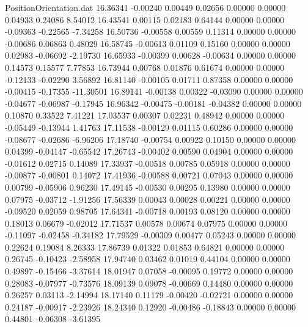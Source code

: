 \begin{filecontents}{PositionOrientation.dat}
  16.36341   -0.00240    0.00449     0.02656    0.00000    0.00000    0.04933    0.24086    8.54012
  16.43541    0.00115    0.02183     0.64144    0.00000    0.00000   -0.09363   -0.22565   -7.34258
  16.50736   -0.00558    0.00559     0.11314    0.00000    0.00000   -0.00686    0.06863    0.48029
  16.58745   -0.00613    0.01109     0.15160    0.00000    0.00000    0.02983   -0.06692   -2.19730
  16.65933   -0.00399    0.00628    -0.00634    0.00000    0.00000    0.14573    0.15577    7.77853
  16.73944    0.00768    0.01876     0.61674    0.00000    0.00000   -0.12133   -0.02290    3.56892
  16.81140   -0.00105    0.01711     0.87358    0.00000    0.00000   -0.00415   -0.17355  -11.30501
  16.89141   -0.00138    0.00322    -0.03090    0.00000    0.00000   -0.04677   -0.06987   -0.17945
  16.96342   -0.00475   -0.00181    -0.04382    0.00000    0.00000    0.10870    0.33522    7.41221
  17.03537    0.00307    0.02231     0.48942    0.00000    0.00000   -0.05449   -0.13944    1.41763
  17.11538   -0.00129    0.01115     0.60286    0.00000    0.00000   -0.08677   -0.02686   -6.96206
  17.18740   -0.00754    0.00922     0.10150    0.00000    0.00000    0.04399   -0.04147   -0.65542
  17.26743   -0.00402    0.00590     0.04904    0.00000    0.00000   -0.01612    0.02715    0.14089
  17.33937   -0.00518    0.00785     0.05918    0.00000    0.00000   -0.00877   -0.00801    0.14072
  17.41936   -0.00588    0.00721     0.07043    0.00000    0.00000    0.00799   -0.05906    0.96230
  17.49145   -0.00530    0.00295     0.13980    0.00000    0.00000    0.07975   -0.03712   -1.91256
  17.56339    0.00043    0.00028     0.00221    0.00000    0.00000   -0.09520    0.02059    0.98705
  17.64341   -0.00718    0.00193     0.08120    0.00000    0.00000    0.18013    0.06679   -0.02012
  17.71537    0.00578    0.00674     0.07975    0.00000    0.00000   -0.11097   -0.02458   -0.34182
  17.79529   -0.00309    0.00477     0.05243    0.00000    0.00000    0.22624    0.19084    8.26333
  17.86739    0.01322    0.01853     0.64821    0.00000    0.00000    0.26745   -0.10423   -2.58958
  17.94740    0.03462    0.01019     0.44104    0.00000    0.00000    0.49897   -0.15466   -3.37614
  18.01947    0.07058   -0.00095     0.19772    0.00000    0.00000    0.28083   -0.07977   -0.73576
  18.09139    0.09078   -0.00669     0.14480    0.00000    0.00000    0.26257    0.03113   -2.14994
  18.17140    0.11179   -0.00420    -0.02721    0.00000    0.00000    0.24187   -0.00917   -2.23926
  18.24340    0.12920   -0.00486    -0.18843    0.00000    0.00000    0.44801   -0.06308   -3.61395

\end{filecontents}
